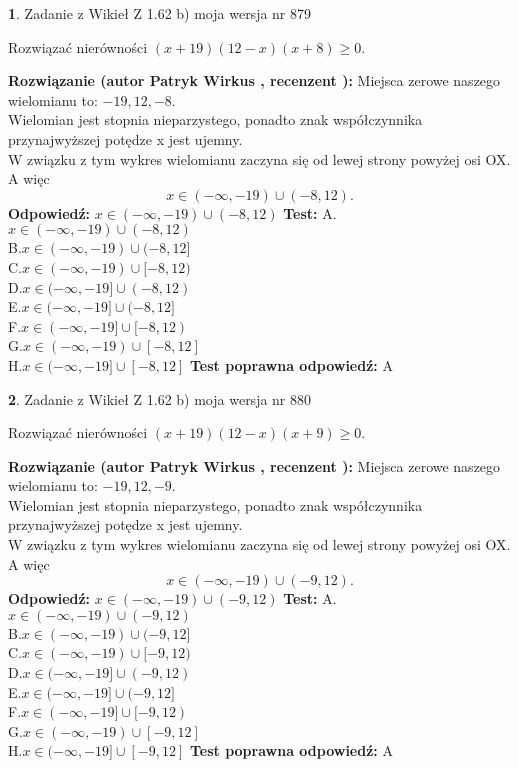 \documentclass[12pt, a4paper]{article}
\theoremstyle{definition} %
\newtheorem{zad}{}
\newcommand{\zadStart}[1]{\begin{zad}#1\newline}
\newcommand{\zadStop}{\end{zad}}
\newcommand{\rozwStart}[2]{\noindent \textbf{Rozwiązanie (autor #1 , recenzent #2): }\newline}
\newcommand{\rozwStop}{\newline}
\newcommand{\odpStart}{\noindent \textbf{Odpowiedź:}\newline}
\newcommand{\odpStop}{\newline}
\newcommand{\testStart}{\noindent \textbf{Test:}\newline}
\newcommand{\testStop}{\newline}
\newcommand{\kluczStart}{\noindent \textbf{Test poprawna odpowiedź:}\newline}
\newcommand{\kluczStop}{\newline}
\begin{document}
\zadStart{Zadanie z Wikieł Z 1.62 b) moja wersja nr 879}

Rozwiązać nierówności $(x+19)(12-x)(x+8)\ge0$.
\zadStop
\rozwStart{Patryk Wirkus}{}
Miejsca zerowe naszego wielomianu to: $-19, 12, -8$.\\
Wielomian jest stopnia nieparzystego, ponadto znak współczynnika przy\linebreak najwyższej potędze x jest ujemny.\\ W związku z tym wykres wielomianu zaczyna się od lewej strony powyżej osi OX. A więc $$x \in (-\infty,-19) \cup (-8,12).$$
\rozwStop
\odpStart
$x \in (-\infty,-19) \cup (-8,12)$
\odpStop
\testStart
A.$x \in (-\infty,-19) \cup (-8,12)$\\
B.$x \in (-\infty,-19) \cup (-8,12]$\\
C.$x \in (-\infty,-19) \cup [-8,12)$\\
D.$x \in (-\infty,-19] \cup (-8,12)$\\
E.$x \in (-\infty,-19] \cup (-8,12]$\\
F.$x \in (-\infty,-19] \cup [-8,12)$\\
G.$x \in (-\infty,-19) \cup [-8,12]$\\
H.$x \in (-\infty,-19] \cup [-8,12]$
\testStop
\kluczStart
A
\kluczStop



\zadStart{Zadanie z Wikieł Z 1.62 b) moja wersja nr 880}

Rozwiązać nierówności $(x+19)(12-x)(x+9)\ge0$.
\zadStop
\rozwStart{Patryk Wirkus}{}
Miejsca zerowe naszego wielomianu to: $-19, 12, -9$.\\
Wielomian jest stopnia nieparzystego, ponadto znak współczynnika przy\linebreak najwyższej potędze x jest ujemny.\\ W związku z tym wykres wielomianu zaczyna się od lewej strony powyżej osi OX. A więc $$x \in (-\infty,-19) \cup (-9,12).$$
\rozwStop
\odpStart
$x \in (-\infty,-19) \cup (-9,12)$
\odpStop
\testStart
A.$x \in (-\infty,-19) \cup (-9,12)$\\
B.$x \in (-\infty,-19) \cup (-9,12]$\\
C.$x \in (-\infty,-19) \cup [-9,12)$\\
D.$x \in (-\infty,-19] \cup (-9,12)$\\
E.$x \in (-\infty,-19] \cup (-9,12]$\\
F.$x \in (-\infty,-19] \cup [-9,12)$\\
G.$x \in (-\infty,-19) \cup [-9,12]$\\
H.$x \in (-\infty,-19] \cup [-9,12]$
\testStop
\kluczStart
A
\kluczStop
\end{document}
